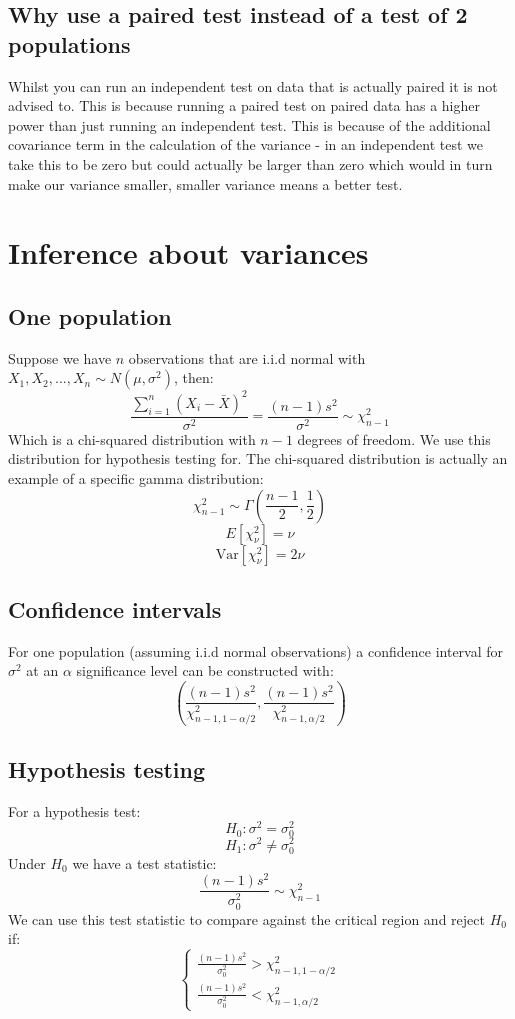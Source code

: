 \documentclass[12pt]{article}
\newcommand{\Var}[1]{\text{Var}[#1]}
\begin{document}
\subsection*{Why use a paired test instead of a test of 2 populations}
Whilst you can run an independent test on data that is actually paired it is not advised to. This is because running a paired test on paired data has a higher power than just running an independent test. This is because of the additional covariance term in the calculation of the variance - in an independent test we take this to be zero but could actually be larger than zero which would in turn make our variance smaller, smaller variance means a better test.
\section{Inference about variances}
\subsection*{One population}
Suppose we have \(n\) observations that are i.i.d normal with \(X_1,X_2,...,X_n\sim N(\mu,\sigma^2)\), then:
\[\frac{\sum_{i=1}^n(X_i-\bar{X})^2}{\sigma^2}=\frac{(n-1)s^2}{\sigma^2}\sim \chi^2_{n-1}\]
Which is a chi-squared distribution with \(n-1\) degrees of freedom. We use this distribution for hypothesis testing for. The chi-squared distribution is actually an example of a specific gamma distribution:
\[\chi^2_{n-1}\sim \Gamma\left(\frac{n-1}{2},\frac{1}{2}\right)\]
\[E[\chi^2_{\nu}]=\nu\]
\[\Var{\chi_\nu^2}=2\nu\]
\subsection*{Confidence intervals}
For one population (assuming i.i.d normal observations) a confidence interval for \(\sigma^2\) at an \(\alpha\) significance level can be constructed with:
\[\left(\frac{(n-1)s^2}{\chi^2_{n-1,1-\alpha/2}},\frac{(n-1)s^2}{\chi^2_{n-1,\alpha/2}}\right)\]
\subsection*{Hypothesis testing}
For a hypothesis test:
\[H_0:\sigma^2= \sigma^2_0\]
\[H_1:\sigma^2\ne\sigma^2_0\]
Under \(H_0\) we have a test statistic:
\[\frac{(n-1)s^2}{\sigma^2_0}\sim \chi^2_{n-1}\]
We can use this test statistic to compare against the critical region and reject \(H_0\) if:
\[\begin{cases}
    \frac{(n-1)s^2}{\sigma^2_0}>\chi^2_{n-1,1-\alpha/2} \\
    \frac{(n-1)s^2}{\sigma^2_0}<\chi^2_{n-1,\alpha/2}
\end{cases}\]
\end{document}

